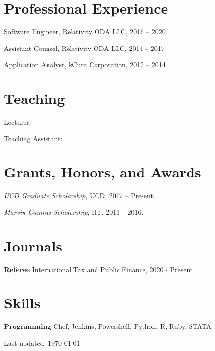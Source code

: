 \documentclass[letterpaper]{article}
\renewenvironment{itemize}{
  \begin{list}{}{
    \setlength{\leftmargin}{1.5em}
  }
}{
  \end{list}
}
\begin{document}
\section*{Professional Experience}
\begin{itemize}
\item{Software Engineer, Relativity ODA LLC, 2016 -- 2020}
\item{Assistant Counsel, Relativity ODA LLC, 2014 -- 2017}
\item{Application Analyst, kCura Corporation, 2012 -- 2014}
\end{itemize}


\section*{Teaching}
\begin{itemize}
\item {Lecturer:}
\item {Teaching Assistant:}
\end{itemize}


\section*{Grants, Honors, and Awards}
\begin{itemize}
\item{\emph{UCD Graduate Scholarship}, UCD, 2017 -- Present.}
\item{\emph{Marvin Camras Scholarship}, IIT, 2011 -- 2016. }
\end{itemize}

\section*{Journals}
\begin{itemize}
\item {\bf Referee}
\subitem International Tax and Public Finance, 2020 - Present
\end{itemize}

\section*{Skills}
\begin{itemize}
\item {\bf Programming}
\subitem Chef, Jenkins, Powershell, Python, R, Ruby, STATA
\end{itemize}

\begin{center}
  \begin{footnotesize}
    Last updated: \today \\
  \end{footnotesize}
\end{center}
\end{document}
